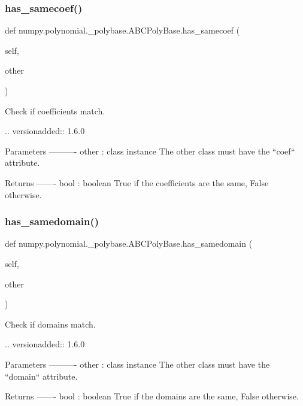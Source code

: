 \subsubsection{\texorpdfstring{has\+\_\+samecoef()}{has\_samecoef()}}
{\footnotesize\ttfamily def numpy.\+polynomial.\+\_\+polybase.\+A\+B\+C\+Poly\+Base.\+has\+\_\+samecoef (\begin{DoxyParamCaption}\item[{}]{self,  }\item[{}]{other }\end{DoxyParamCaption})}

\begin{DoxyVerb}Check if coefficients match.

.. versionadded:: 1.6.0

Parameters
----------
other : class instance
    The other class must have the ``coef`` attribute.

Returns
-------
bool : boolean
    True if the coefficients are the same, False otherwise.\end{DoxyVerb}
 \mbox{\label{classnumpy_1_1polynomial_1_1__polybase_1_1ABCPolyBase_a9e80ac9e9beba9fbfe0e4b6b5e4ce5d1}} 
\subsubsection{\texorpdfstring{has\+\_\+samedomain()}{has\_samedomain()}}
{\footnotesize\ttfamily def numpy.\+polynomial.\+\_\+polybase.\+A\+B\+C\+Poly\+Base.\+has\+\_\+samedomain (\begin{DoxyParamCaption}\item[{}]{self,  }\item[{}]{other }\end{DoxyParamCaption})}

\begin{DoxyVerb}Check if domains match.

.. versionadded:: 1.6.0

Parameters
----------
other : class instance
    The other class must have the ``domain`` attribute.

Returns
-------
bool : boolean
    True if the domains are the same, False otherwise.\end{DoxyVerb}
 \mbox{\label{classnumpy_1_1polynomial_1_1__polybase_1_1ABCPolyBase_adfdcfcbcb5d67be08c3af00e05b5af26}} 
